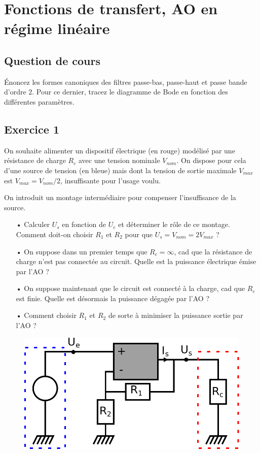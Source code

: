 \documentclass{report}
\begin{document}
\chapter{Fonctions de transfert, AO en régime linéaire}

\newpage

\section*{Question de cours}
Énoncez les formes canoniques des filtres passe-bas, passe-haut et passe bande d'ordre 2. Pour ce dernier, tracez le diagramme de Bode en fonction des différentes paramètres.

\section*{Exercice 1}
 
On souhaite alimenter un dispositif électrique (en rouge) modélisé par une résistance de charge $R_c$ avec une tension nominale $V_{nom}$. On dispose pour cela d'une source de tension (en bleue) mais dont la tension de sortie maximale $V_{max}$ est $V_{max} = V_{nom}/2$, insuffisante pour l'usage voulu.

On introduit un montage intermédiaire pour compenser l'insuffisance de la source. 

\begin{itemize}
	\item[•] Calculer $U_s$ en fonction de $U_e$ et déterminer le rôle de ce montage. Comment doit-on choisir $R_1$ et $R_2$ pour que $U_s = V_{nom}=2V_{max}$ ?
	\item[•]  On suppose dans un premier temps que $R_c=\infty$, cad que la résistance de charge n'est pas connectée au circuit. Quelle est la puissance électrique émise par l'AO ?
	\item[•] On suppose maintenant que le circuit est connecté à la charge, cad que $R_c$ est finie. Quelle est désormais la puissance dégagée par l'AO ?
	\item[•] Comment choisir $R_1$ et $R_2$ de sorte à minimiser la puissance sortie par l'AO ?
\end{itemize}

\begin{figure}[!h]
\centering
\includegraphics[width=0.5\linewidth]{puissance_AO.pdf}
\end{figure}
\end{document}
